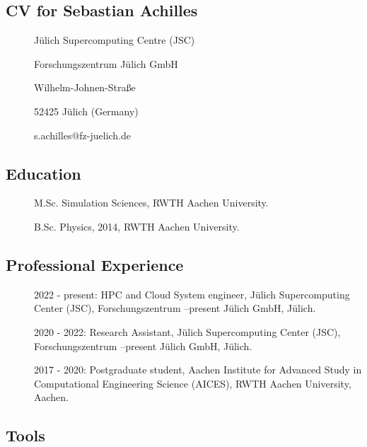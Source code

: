 
\subsection{CV for Sebastian Achilles}


\begin{description}
\item[] J\"ulich Supercomputing Centre (JSC)
\item[] Forschungszentrum J\"ulich GmbH
\item[] Wilhelm-Johnen-Stra{\ss}e
\item[] 52425 J\"ulich (Germany)
\item[] s.achilles@fz-juelich.de
\end{description}

\subsection*{Education}

\begin{description}
\item[] M.Sc. Simulation Sciences, RWTH Aachen University.
\item[] B.Sc. Physics, 2014, RWTH Aachen University.
\end{description}

\subsection*{Professional Experience}

\begin{description}
\item[] 2022 - present: HPC and Cloud System engineer, Jülich Supercomputing Center (JSC), Forschungszentrum
–present Jülich GmbH, Jülich.
\item[] 2020 - 2022: Research Assistant, Jülich Supercomputing Center (JSC), Forschungszentrum
–present Jülich GmbH, Jülich.
\item[] 2017 - 2020: Postgraduate student, Aachen Institute for Advanced Study in Computational Engineering Science (AICES), RWTH Aachen University, Aachen.

\end{description}

\subsection*{Tools}

